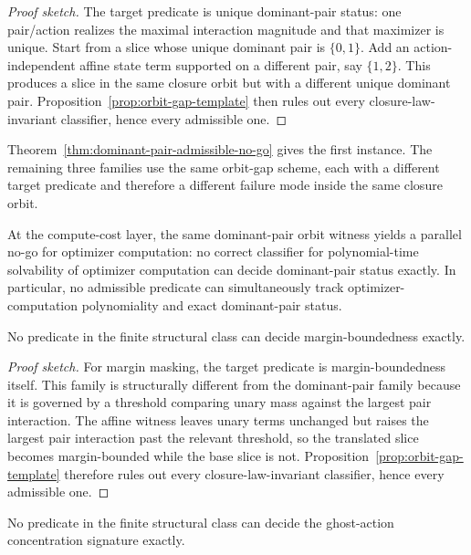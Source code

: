 \begin{proof}[Proof sketch]
The target predicate is unique dominant-pair status: one pair/action realizes the maximal interaction magnitude and that maximizer is unique. Start from a slice whose unique dominant pair is $\{0,1\}$. Add an action-independent affine state term supported on a different pair, say $\{1,2\}$. This produces a slice in the same closure orbit but with a different unique dominant pair. Proposition~\ref{prop:orbit-gap-template} then rules out every closure-law-invariant classifier, hence every admissible one.
\end{proof}

Theorem~\ref{thm:dominant-pair-admissible-no-go} gives the first instance. The remaining three families use the same orbit-gap scheme, each with a different target predicate and therefore a different failure mode inside the same closure orbit.

At the compute-cost layer, the same dominant-pair orbit witness yields a parallel no-go for optimizer computation: no correct classifier for polynomial-time solvability of optimizer computation can decide dominant-pair status exactly. In particular, no admissible predicate can simultaneously track optimizer-computation polynomiality and exact dominant-pair status.

\begin{theorem}\label{thm:margin-masking-admissible-no-go}
No predicate in the finite structural class can decide margin-boundedness exactly.
\end{theorem}

\begin{proof}[Proof sketch]
For margin masking, the target predicate is margin-boundedness itself. This family is structurally different from the dominant-pair family because it is governed by a threshold comparing unary mass against the largest pair interaction. The affine witness leaves unary terms unchanged but raises the largest pair interaction past the relevant threshold, so the translated slice becomes margin-bounded while the base slice is not. Proposition~\ref{prop:orbit-gap-template} therefore rules out every closure-law-invariant classifier, hence every admissible one.
\end{proof}

\begin{theorem}\label{thm:ghost-action-admissible-no-go}
No predicate in the finite structural class can decide the ghost-action concentration signature exactly.
\end{theorem}

